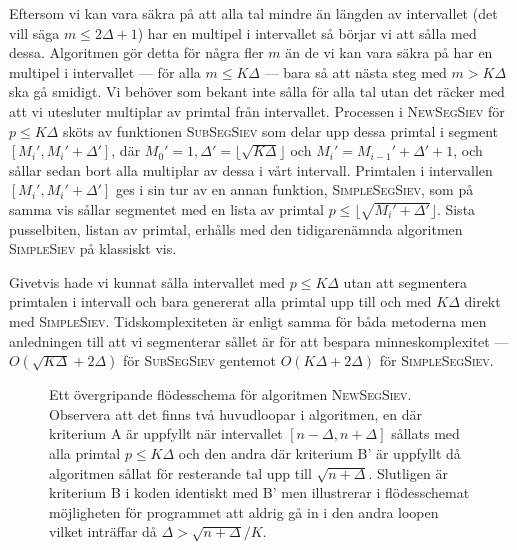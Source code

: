 Eftersom vi kan vara säkra på att alla tal mindre än längden av intervallet (det vill säga \(m \leq 2 \Delta + 1\)) har en multipel i intervallet så börjar vi att sålla med dessa. Algoritmen gör detta för några fler \(m\) än de vi kan vara säkra på har en multipel i intervallet --- för alla \(m \leq K \Delta\) --- bara så att nästa steg med \(m > K \Delta\) ska gå smidigt. Vi behöver som bekant inte sålla för alla tal utan det räcker med att vi utesluter multiplar av primtal från intervallet. Processen i \textsc{NewSegSiev} för \(p \leq K \Delta\) sköts av funktionen \textsc{SubSegSiev} som delar upp dessa primtal i segment \([M_i', M_i' + \Delta']\), där \(M_0' = 1, \Delta' = \lfloor \sqrt{K \Delta} \rfloor\) och \(M_i' = M_{i-1}' + \Delta' + 1\), och sållar sedan bort alla multiplar av dessa i vårt intervall. Primtalen i intervallen \([M_i', M_i' + \Delta']\) ges i sin tur av en annan funktion, \textsc{SimpleSegSiev}, som på samma vis sållar segmentet med en lista av primtal \(p \leq \lfloor\sqrt{M_i' + \Delta'}\rfloor\). Sista pusselbiten, listan av primtal, erhålls med den tidigarenämnda algoritmen \textsc{SimpleSiev} på klassiskt vis. 

Givetvis hade vi kunnat sålla intervallet med \(p \leq K \Delta\) utan att segmentera primtalen i intervall och bara genererat alla primtal upp till och med \(K \Delta\) direkt med \textsc{SimpleSiev}. Tidskomplexiteten är enligt \cite{HaraldSieve} samma för båda metoderna men anledningen till att vi segmenterar sållet är för att bespara minneskomplexitet --- \(O(\sqrt{K \Delta} + 2\Delta)\) för \textsc{SubSegSiev} gentemot \(O(K \Delta + 2\Delta)\) för \textsc{SimpleSegSiev}. 


\begin{figure}
    \centering
    
    \caption{Ett övergripande flödesschema för algoritmen \textsc{NewSegSiev}. Observera att det finns två huvudloopar i algoritmen, en där kriterium A är uppfyllt när intervallet \([n - \Delta, n + \Delta]\) sållats med alla primtal \(p \leq K \Delta\) och den andra där kriterium B' är uppfyllt då algoritmen sållat för resterande tal upp till \(\sqrt{n + \Delta}\). Slutligen är kriterium B i koden identiskt med B' men illustrerar i flödesschemat möjligheten för programmet att aldrig gå in i den andra loopen vilket inträffar då \(\Delta > \sqrt{n + \Delta}/K\).}
    \label{fig:flowchart}
\end{figure}


